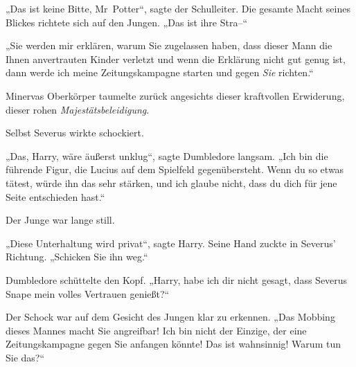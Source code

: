 „Das ist keine Bitte, Mr~Potter“, sagte der Schulleiter. Die gesamte Macht seines Blickes richtete sich auf den Jungen. „Das ist ihre Stra–“ 

„Sie werden mir erklären, warum Sie zugelassen haben, dass dieser Mann die Ihnen anvertrauten Kinder verletzt und wenn die Erklärung nicht gut genug ist, dann werde ich meine Zeitungskampagne starten und gegen \emph{Sie} richten.“ 

Minervas Oberkörper taumelte zurück angesichts dieser kraftvollen Erwiderung, dieser rohen \emph{Majestätsbeleidigung}. 

Selbst Severus wirkte schockiert. 

„Das, Harry, wäre äußerst unklug“, sagte Dumbledore langsam. „Ich bin die führende Figur, die Lucius auf dem Spielfeld gegenübersteht. Wenn du so etwas tätest, würde ihn das sehr stärken, und ich glaube nicht, dass du dich für jene Seite entschieden hast.“ 

Der Junge war lange still. 

„Diese Unterhaltung wird privat“, sagte Harry. Seine Hand zuckte in Severus’ Richtung. „Schicken Sie ihn weg.“ 

Dumbledore schüttelte den Kopf. „Harry, habe ich dir nicht gesagt, dass Severus Snape mein volles Vertrauen genießt?“ 

Der Schock war auf dem Gesicht des Jungen klar zu erkennen. „Das Mobbing dieses Mannes macht Sie angreifbar! Ich bin nicht der Einzige, der eine Zeitungskampagne gegen Sie anfangen könnte! Das ist wahnsinnig! Warum tun Sie das?“ 


